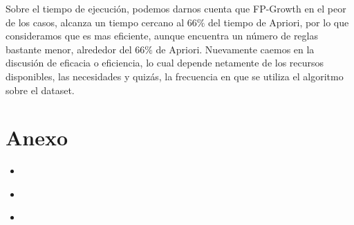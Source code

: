 \documentclass{article}
\newcommand{\python}[2]{
  \begin{itemize}
    \item[]
  \end{itemize}
}
\newcommand{\bash}[2]{
  \begin{itemize}
    \item[]
  \end{itemize}
}
\begin{document}
Sobre el tiempo de ejecución, podemos darnos cuenta que FP-Growth en el peor de los casos, alcanza un tiempo cercano al $66\%$ del tiempo de Apriori, por lo que consideramos que es mas eficiente, aunque encuentra un número de reglas bastante menor, alrededor del $66\%$ de Apriori. Nuevamente caemos en la discusión de eficacia o eficiencia, lo cual depende netamente de los recursos disponibles, las necesidades y quizás, la frecuencia en que se utiliza el algoritmo sobre el dataset.

\section{Anexo}\label{anexo}

  \python{src/plotter}{Generador de gráficos para todos los parámetros}
  \bash{src/run}{Ejecuta Weka dado los parámetros indicados}
  \bash{src/filter}{Filtra elementos específicos del dataset}
\end{document}
